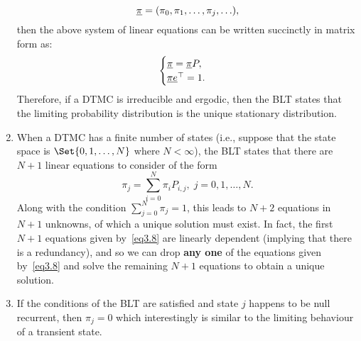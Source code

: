 \begin{Result}
\begin{enumerate}[(1)]
              \[ \underline{\pi}=(\pi_0,\pi_1,\ldots,\pi_j,\ldots), \]
              then the above system of linear equations can be written succinctly in matrix form as:
              \[ \begin{cases}
                      \underline{\pi}=\underline{\pi}P, \\
                      \underline{\pi}\underline{e}^\top=1.
                  \end{cases} \]
              Therefore, if a DTMC is irreducible and ergodic, then the BLT states that the limiting
              probability distribution is the unique stationary distribution.
        \item When a DTMC has a finite number of states (i.e., suppose that the state space is
              $ \Set{0,1,\ldots,N} $ where $ N<\infty $), the BLT states that there are $N + 1 $ linear equations to
              consider of the form
              \[ \pi_j=\sum_{i=0}^{N} \pi_i P_{i,j},\;j=0,1,\ldots,N.\label{eq3.8}\tag*{(3.8)} \]
              Along with the condition $ \sum_{j=0}^{N} \pi_j=1 $, this leads to $N + 2$ equations in $N + 1$ unknowns,
              of which a unique solution must exist. In fact, the first $N + 1$ equations given by~\ref{eq3.8} are
              linearly dependent (implying that there is a redundancy), and so we can drop \textbf{any one} of
              the equations given by~\ref{eq3.8} and solve the remaining $N + 1$ equations to obtain a unique
              solution.
        \item If the conditions of the BLT are satisfied and state $j$ happens to be null recurrent, then
              $ \pi_j=0 $ which interestingly is similar to the limiting behaviour of a transient state.
    \end{enumerate}
\end{Result}
